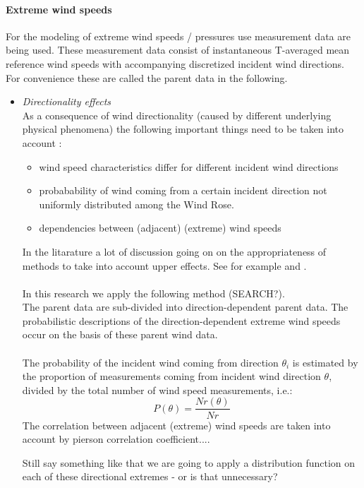 \paragraph{Extreme wind speeds}
For the modeling of extreme wind speeds / pressures use measurement data are being used. These measurement data consist of instantaneous T-averaged mean reference wind speeds with accompanying discretized incident wind directions. For convenience these are called the parent data in the following.
\begin{itemize}
\item 
\textit{Directionality effects}\\
As a consequence of wind directionality (caused by different underlying physical phenomena) the following important things need to be taken into account :
\begin{itemize}
\item 
wind speed characteristics differ for different incident wind directions 
\item 
probabability of wind coming from a certain incident direction not uniformly distributed among the Wind Rose.
\item 
dependencies between (adjacent) (extreme) wind speeds
\end{itemize}
In the litarature a lot of discussion going on on the appropriateness of methods to take into account upper effects. See for example \cite{Morarty_1983} and \cite{Isyumov2014169}.\\
\\
In this research we apply the following method (SEARCH?). \\
The parent data are sub-divided into direction-dependent parent data. The probabilistic descriptions of the direction-dependent extreme wind speeds occur on the basis of these parent wind data. \\
\\
The probability of the incident wind coming from direction $\theta_i$ is estimated by the proportion of measurements coming from incident wind direction $\theta$, divided by the total number of wind speed measurements, i.e.:
\begin{equation}
P(\theta)=\frac{Nr(\theta)}{Nr}
\end{equation} 
The correlation between adjacent (extreme) wind speeds are taken into account by pierson correlation coefficient....  

\begin{framed}
Still say something like that we are going to apply a distribution function on each of these directional extremes - or is that unnecessary? 
\end{framed}




\end{itemize}
